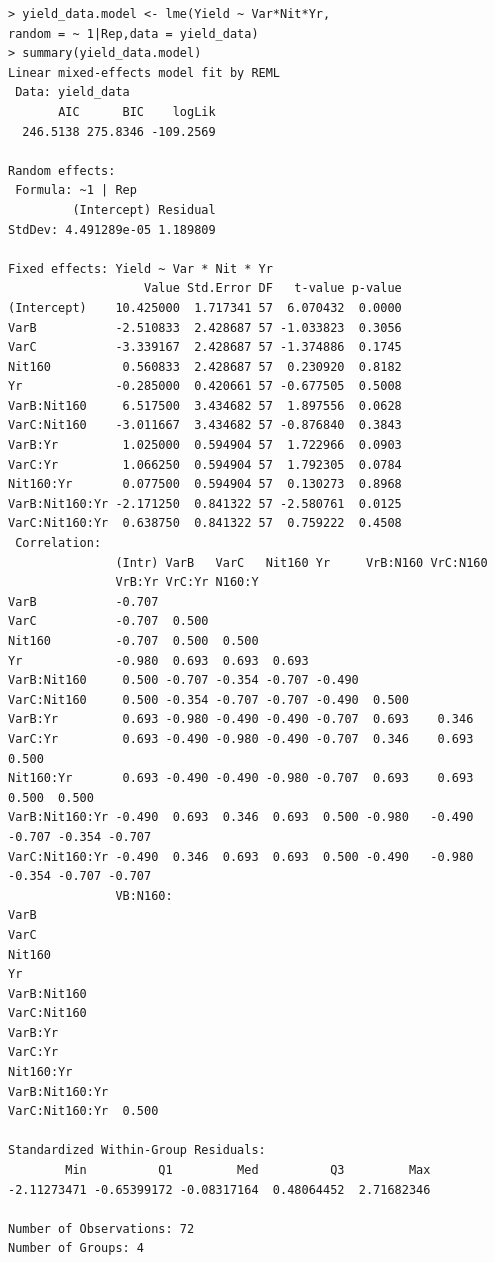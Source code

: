 \documentclass[12pt,letterpaper]{article}
\begin{document}
\begin{lstlisting}[label=R Code,caption=Q5(c) R Code Output]
> yield_data.model <- lme(Yield ~ Var*Nit*Yr,
random = ~ 1|Rep,data = yield_data)
> summary(yield_data.model)
Linear mixed-effects model fit by REML
 Data: yield_data 
       AIC      BIC    logLik
  246.5138 275.8346 -109.2569

Random effects:
 Formula: ~1 | Rep
         (Intercept) Residual
StdDev: 4.491289e-05 1.189809

Fixed effects: Yield ~ Var * Nit * Yr 
                   Value Std.Error DF   t-value p-value
(Intercept)    10.425000  1.717341 57  6.070432  0.0000
VarB           -2.510833  2.428687 57 -1.033823  0.3056
VarC           -3.339167  2.428687 57 -1.374886  0.1745
Nit160          0.560833  2.428687 57  0.230920  0.8182
Yr             -0.285000  0.420661 57 -0.677505  0.5008
VarB:Nit160     6.517500  3.434682 57  1.897556  0.0628
VarC:Nit160    -3.011667  3.434682 57 -0.876840  0.3843
VarB:Yr         1.025000  0.594904 57  1.722966  0.0903
VarC:Yr         1.066250  0.594904 57  1.792305  0.0784
Nit160:Yr       0.077500  0.594904 57  0.130273  0.8968
VarB:Nit160:Yr -2.171250  0.841322 57 -2.580761  0.0125
VarC:Nit160:Yr  0.638750  0.841322 57  0.759222  0.4508
 Correlation: 
               (Intr) VarB   VarC   Nit160 Yr     VrB:N160 VrC:N160
               VrB:Yr VrC:Yr N160:Y
VarB           -0.707                                                                   
VarC           -0.707  0.500                                                            
Nit160         -0.707  0.500  0.500                                                     
Yr             -0.980  0.693  0.693  0.693                                              
VarB:Nit160     0.500 -0.707 -0.354 -0.707 -0.490                                       
VarC:Nit160     0.500 -0.354 -0.707 -0.707 -0.490  0.500                                
VarB:Yr         0.693 -0.980 -0.490 -0.490 -0.707  0.693    0.346                       
VarC:Yr         0.693 -0.490 -0.980 -0.490 -0.707  0.346    0.693    0.500              
Nit160:Yr       0.693 -0.490 -0.490 -0.980 -0.707  0.693    0.693    0.500  0.500       
VarB:Nit160:Yr -0.490  0.693  0.346  0.693  0.500 -0.980   -0.490   -0.707 -0.354 -0.707
VarC:Nit160:Yr -0.490  0.346  0.693  0.693  0.500 -0.490   -0.980   -0.354 -0.707 -0.707
               VB:N160:
VarB                   
VarC                   
Nit160                 
Yr                     
VarB:Nit160            
VarC:Nit160            
VarB:Yr                
VarC:Yr                
Nit160:Yr              
VarB:Nit160:Yr         
VarC:Nit160:Yr  0.500  

Standardized Within-Group Residuals:
        Min          Q1         Med          Q3         Max 
-2.11273471 -0.65399172 -0.08317164  0.48064452  2.71682346 

Number of Observations: 72
Number of Groups: 4 
 
 
 
 
 
\end{lstlisting}
\end{document}
